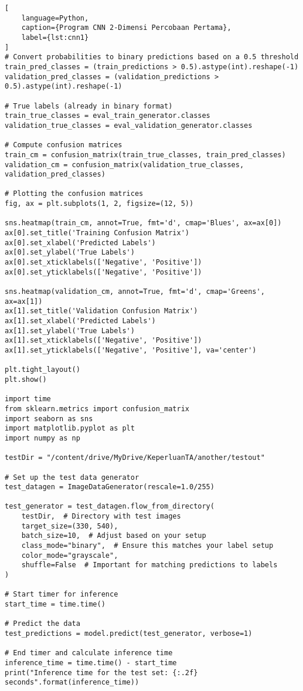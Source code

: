 \begin{lstlisting}[
    language=Python,
    caption={Program CNN 2-Dimensi Percobaan Pertama},
    label={lst:cnn1}
]
# Convert probabilities to binary predictions based on a 0.5 threshold
train_pred_classes = (train_predictions > 0.5).astype(int).reshape(-1)
validation_pred_classes = (validation_predictions > 0.5).astype(int).reshape(-1)

# True labels (already in binary format)
train_true_classes = eval_train_generator.classes
validation_true_classes = eval_validation_generator.classes

# Compute confusion matrices
train_cm = confusion_matrix(train_true_classes, train_pred_classes)
validation_cm = confusion_matrix(validation_true_classes, validation_pred_classes)

# Plotting the confusion matrices
fig, ax = plt.subplots(1, 2, figsize=(12, 5))

sns.heatmap(train_cm, annot=True, fmt='d', cmap='Blues', ax=ax[0])
ax[0].set_title('Training Confusion Matrix')
ax[0].set_xlabel('Predicted Labels')
ax[0].set_ylabel('True Labels')
ax[0].set_xticklabels(['Negative', 'Positive'])
ax[0].set_yticklabels(['Negative', 'Positive'])

sns.heatmap(validation_cm, annot=True, fmt='d', cmap='Greens', ax=ax[1])
ax[1].set_title('Validation Confusion Matrix')
ax[1].set_xlabel('Predicted Labels')
ax[1].set_ylabel('True Labels')
ax[1].set_xticklabels(['Negative', 'Positive'])
ax[1].set_yticklabels(['Negative', 'Positive'], va='center')

plt.tight_layout()
plt.show()

import time
from sklearn.metrics import confusion_matrix
import seaborn as sns
import matplotlib.pyplot as plt
import numpy as np

testDir = "/content/drive/MyDrive/KeperluanTA/another/testout"

# Set up the test data generator
test_datagen = ImageDataGenerator(rescale=1.0/255)

test_generator = test_datagen.flow_from_directory(
    testDir,  # Directory with test images
    target_size=(330, 540),
    batch_size=10,  # Adjust based on your setup
    class_mode="binary",  # Ensure this matches your label setup
    color_mode="grayscale",
    shuffle=False  # Important for matching predictions to labels
)

# Start timer for inference
start_time = time.time()

# Predict the data
test_predictions = model.predict(test_generator, verbose=1)

# End timer and calculate inference time
inference_time = time.time() - start_time
print("Inference time for the test set: {:.2f} seconds".format(inference_time))


\end{lstlisting}
